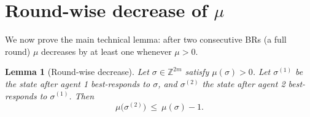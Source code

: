 \documentclass[11pt]{article}
\newtheorem{lemma}{Lemma}[section]
\begin{document}
\section{Round-wise decrease of \(\mu\)}

We now prove the main technical lemma: after two consecutive BRs
(a full round) \(\mu\) decreases by at least one whenever \(\mu>0\).

\begin{lemma}[Round-wise decrease]\label{lem:round}
Let \(\sigma\in\mathbb Z^{2m}\) satisfy \(\mu(\sigma)>0\).
Let \(\sigma^{(1)}\) be the state after agent 1 best-responds to
\(\sigma\), and \(\sigma^{(2)}\) the state after agent 2 best-responds
to \(\sigma^{(1)}\). Then
\[
\mu\big(\sigma^{(2)}\big)\ \le\ \mu(\sigma)-1.
\]
\end{lemma}
\end{document}
